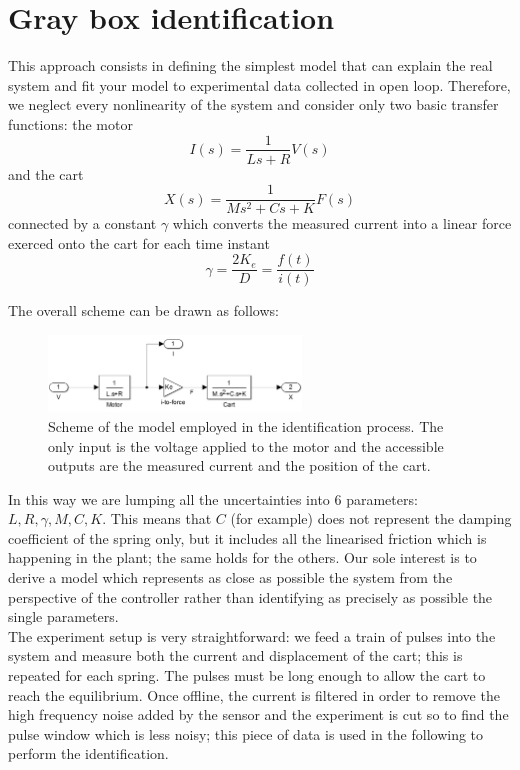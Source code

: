 \chapter{Gray box identification}
This approach consists in defining the simplest model that can explain the real system and fit your model to experimental data collected in open loop. Therefore, we neglect every nonlinearity of the system and consider only two basic transfer functions: 
the motor
\begin{equation}
I(s) = \frac{1}{Ls+R} V(s)
\end{equation}
and the cart
\begin{equation}
X(s) = \frac{1}{Ms^2+Cs+K} F(s)
\end{equation}
connected by a constant $\gamma$ which converts the measured current into a linear force exerced onto the cart for each time instant
\begin{equation}
\gamma = \frac{2K_e}{D}=\frac{f(t)}{i(t)}
\end{equation}

The overall scheme can be drawn as follows:\\

\begin{figure}[h]
\centering
\includegraphics[width=0.6\textwidth]{img/graybox_scheme.png}
\caption{Scheme of the model employed in the identification process. The only input is the voltage applied to the motor and the accessible outputs are the measured current and the position of the cart.}
\end{figure}

In this way we are lumping all the uncertainties into 6 parameters: $L, R, \gamma, M, C, K$. This means that $C$ (for example) does not represent the damping coefficient of the spring only, but it includes all the linearised friction which is happening in the plant; the same holds for the others. Our sole interest is to derive a model which represents as close as possible the system from the perspective of the controller rather than identifying as precisely as possible the single parameters.\\

The experiment setup is very straightforward: we feed a train of pulses into the system and measure both the current and displacement of the cart; this is repeated for each spring. The pulses must be long enough to allow the cart to reach the equilibrium. Once offline, the current is filtered in order to remove the high frequency noise added by the sensor and the experiment is cut so to find the pulse window which is less noisy; this piece of data is used in the following to perform the identification.\\

